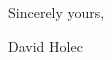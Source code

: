\documentclass{mul-letter}
\begin{document}
           
\showdate       
\subject{WHAT}


Sincerely yours,\bigskip\bigskip


\hspace*{10cm}David Holec
\end{document}
